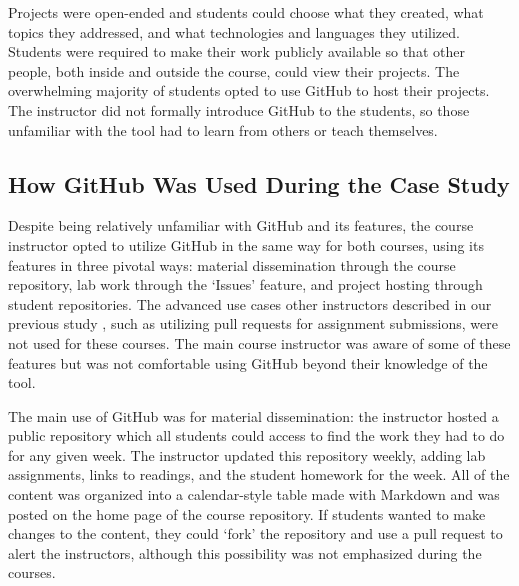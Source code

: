 Projects were open-ended and students could choose what they created, what topics they addressed, and what technologies and languages they utilized. Students were required to make their work publicly available so that other people, both inside and outside the course, could view their projects. The overwhelming majority of students opted to use GitHub to host their projects. The instructor did not formally introduce GitHub to the students, so those unfamiliar with the tool had to learn from others or teach themselves.

\subsection{How GitHub Was Used During the Case Study}
Despite being relatively unfamiliar with GitHub and its features, the course instructor opted to utilize GitHub in the same way for both courses, using its features in three pivotal ways: material dissemination through the course repository, lab work through the `Issues' feature, and project hosting through student repositories. The advanced use cases other instructors described in our previous study \cite{zagalsky2015emergence}, such as utilizing pull requests for assignment submissions, were not used for these courses. The main course instructor was aware of some of these features but was not comfortable using GitHub beyond their knowledge of the tool.

The main use of GitHub was for material dissemination: the instructor hosted a public repository which all students could access to find the work they had to do for any given week. The instructor updated this repository weekly, adding lab assignments, links to readings, and the student homework for the week. All of the content was organized into a calendar-style table made with Markdown and was posted on the home page of the course repository. If students wanted to make changes to the content, they could `fork' the repository and use a pull request to alert the instructors, although this possibility was not emphasized during the courses.

